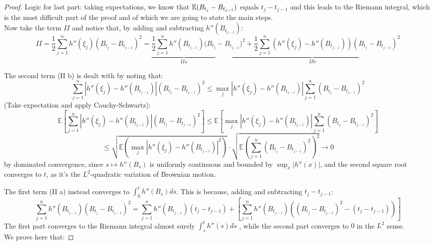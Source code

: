 \begin{ProofBox}
\begin{proof}
Logic for last part: taking expectations, we know that $\mathbb{E}(B_{t_j} - B_{t_{j-1}})$ equals  $t_j - t_{j-1} $ and this leads to the Riemann integral, which is the most difficult part of the proof and of which we are going to state the main steps. \\

Now take the term \( II \) and notice that, by adding and subtracting $h''(B_{t_{j-1}})$:
\[
II = \frac{1}{2} \sum_{j=1}^{n} h''(\xi_j) (B_{t_j} - B_{t_{j-1}})^2
= \underbrace{\frac{1}{2} \sum_{j=1}^{n} h''(B_{t_{j-1}}) (B_{t_j} }_{II \text{a}} - \underbrace{B_{t_{j-1}})^2 + \frac{1}{2} \sum_{j=1}^{n} (h''(\xi_j) - h''(B_{t_{j-1}})) (B_{t_j} - B_{t_{j-1}})^2}_{II \text{b}}
\]

The second term (II b) is dealt with by noting that:
\[
\sum_{j=1}^{n} |h''(\xi_j) - h''(B_{t_{j-1}})| (B_{t_j} - B_{t_{j-1}})^2 
\leq \max_j |h''(\xi_j) - h''(B_{t_{j-1}})| \sum_{j=1}^{n} (B_{t_j} - B_{t_{j-1}})^2
\]
(Take expectation and apply Cauchy-Schwartz):
\[
\mathbb{E} \left[ \sum_{j=1}^{n} |h''(\xi_j) - h''(B_{t_{j-1}})| (B_{t_j} - B_{t_{j-1}})^2 \right]
\leq \mathbb{E} \left[ \max_j |h''(\xi_j) - h''(B_{t_{j-1}})| \sum_{j=1}^{n} (B_{t_j} - B_{t_{j-1}})^2 \right]
\]
\[
\leq \sqrt{\mathbb{E} \left( \max_j |h''(\xi_j) - h''(B_{t_{j-1}})|^2 \right)} \cdot \sqrt{\mathbb{E} \left( \sum_{j=1}^{n} (B_{t_j} - B_{t_{j-1}})^2 \right)^2 } \to 0
\]
by dominated convergence, since \( s \mapsto h''(B_s) \) is uniformly continuous and bounded by \( \sup_x |h''(x)| \), and the second square root converges to \( t \), as it’s the \( L^2 \)-quadratic variation of Brownian motion.

The first term (II a) instead converges to \( \int_0^t h''(B_s) ds \). This is because, adding and subtracting $t_j - t_{j-1}$:
\[
\sum_{j=1}^{n} h''(B_{t_{j-1}}) (B_{t_j} - B_{t_{j-1}})^2
= \sum_{j=1}^{n} h''(B_{t_{j-1}}) (t_j - t_{j-1}) + \left[ \sum_{j=1}^{n} h''(B_{t_{j-1}}) \left( (B_{t_j} - B_{t_{j-1}})^2 - (t_j - t_{j-1}) \right) \right]
\]
The first part converges to the Riemann integral almost surely $\int_s^t h''(s) ds$ , while the second part converges to $0$ in the $L^2$ sense. \\
We prove here that:


\end{proof}
\end{ProofBox}

